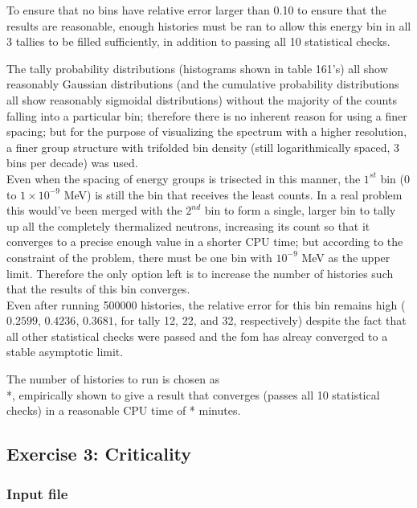 \documentclass[a4paper, 12pt]{article}
\begin{document}
To ensure that no bins have relative error larger than 0.10 to ensure that the results are reasonable, enough histories must be ran to allow this energy bin in all 3 tallies to be filled sufficiently, in addition to passing all 10 statistical checks.

The tally probability distributions (histograms shown in table 161's) all show reasonably Gaussian distributions (and the cumulative probability distributions all show reasonably sigmoidal distributions) without the majority of the counts falling into a particular bin; therefore there is no inherent reason for using a finer spacing; but for the purpose of visualizing the spectrum with a higher resolution, a finer group structure with trifolded bin density (still logarithmically spaced, 3 bins per decade) was used.
\\Even when the spacing of energy groups is trisected in this manner, the $1^{st}$ bin ($0$ to $1\times 10^{-9}$ MeV) is still the bin that receives the least counts. In a real problem this would've been merged with the $2^{nd}$ bin to form a single, larger bin to tally up all the completely thermalized neutrons, increasing its count so that it converges to a precise enough value in a shorter CPU time; but according to the constraint of the problem, there must be one bin with ${10^{-9}}$ MeV as the upper limit. Therefore the only option left is to increase the number of histories such that the results of this bin converges.
\\Even after running 500000 histories, the relative error for this bin remains high ($0.2599$, $0.4236$, $0.3681$, for tally 12, 22, and 32, respectively) despite the fact that all other statistical checks were passed and the fom has alreay converged to a stable asymptotic limit.

The number of histories to run is chosen as \\*, empirically shown to give a result that converges (passes all 10 statistical checks) in a reasonable CPU time of * minutes.

\subsection{Exercise 3: Criticality}
\subsubsection{Input file}
\end{document}
